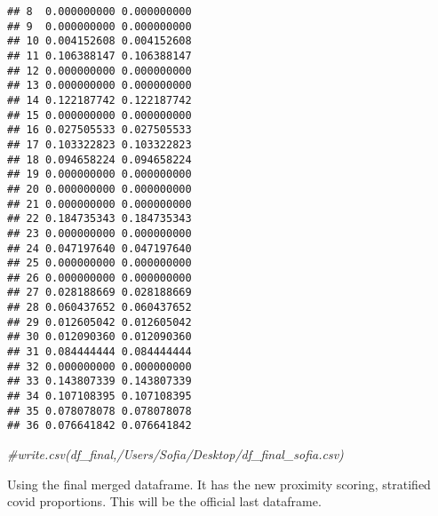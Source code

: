 \documentclass[]{article}
\newenvironment{Shaded}{\begin{snugshade}}{\end{snugshade}}
\newcommand{\CommentTok}[1]{\textcolor[rgb]{0.56,0.35,0.01}{\textit{#1}}}
\begin{document}
\begin{verbatim}
## 8  0.000000000 0.000000000
## 9  0.000000000 0.000000000
## 10 0.004152608 0.004152608
## 11 0.106388147 0.106388147
## 12 0.000000000 0.000000000
## 13 0.000000000 0.000000000
## 14 0.122187742 0.122187742
## 15 0.000000000 0.000000000
## 16 0.027505533 0.027505533
## 17 0.103322823 0.103322823
## 18 0.094658224 0.094658224
## 19 0.000000000 0.000000000
## 20 0.000000000 0.000000000
## 21 0.000000000 0.000000000
## 22 0.184735343 0.184735343
## 23 0.000000000 0.000000000
## 24 0.047197640 0.047197640
## 25 0.000000000 0.000000000
## 26 0.000000000 0.000000000
## 27 0.028188669 0.028188669
## 28 0.060437652 0.060437652
## 29 0.012605042 0.012605042
## 30 0.012090360 0.012090360
## 31 0.084444444 0.084444444
## 32 0.000000000 0.000000000
## 33 0.143807339 0.143807339
## 34 0.107108395 0.107108395
## 35 0.078078078 0.078078078
## 36 0.076641842 0.076641842
\end{verbatim}

\begin{Shaded}
\begin{Highlighting}[]
\CommentTok{\#write.csv(df\_final,\textquotesingle{}/Users/Sofia/Desktop/df\_final\_sofia.csv\textquotesingle{})}
\end{Highlighting}
\end{Shaded}

Using the final merged dataframe. It has the new proximity scoring,
stratified covid proportions. This will be the official last dataframe.
\end{document}
